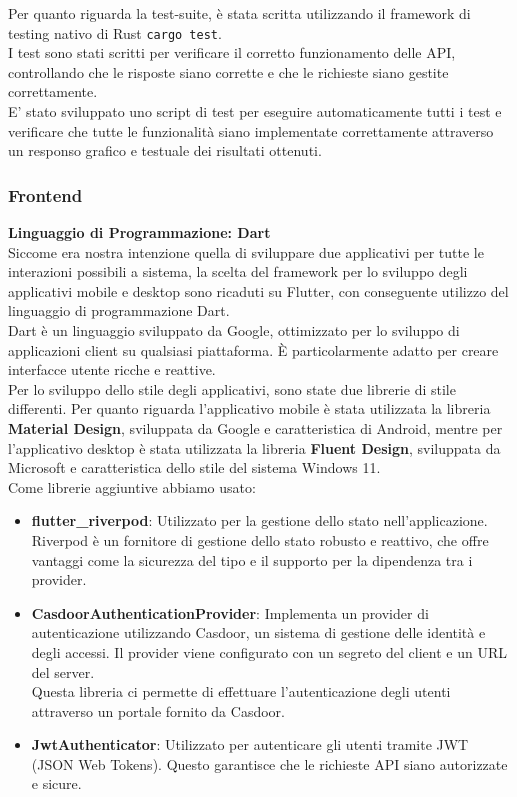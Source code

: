 \documentclass{article}
\begin{document}
Per quanto riguarda la test-suite, è stata scritta utilizzando il framework di testing nativo di Rust \texttt{cargo test}.\\
I test sono stati scritti per verificare il corretto funzionamento delle API, controllando che le risposte siano corrette e che le richieste siano gestite correttamente.\\
E' stato sviluppato uno script di test per eseguire automaticamente tutti i test e verificare che tutte le funzionalità siano implementate correttamente attraverso un responso grafico e testuale dei risultati ottenuti.

\subsubsection{Frontend}
\textbf{Linguaggio di Programmazione: Dart}\\
Siccome era nostra intenzione quella di sviluppare due applicativi per tutte le interazioni possibili a sistema, la scelta del framework per lo sviluppo degli applicativi mobile e desktop sono ricaduti su Flutter, con conseguente utilizzo del linguaggio di programmazione Dart.\\
 Dart è un linguaggio sviluppato da Google, ottimizzato per lo sviluppo di applicazioni client su qualsiasi piattaforma. È particolarmente adatto per creare interfacce utente ricche e reattive.\\
Per lo sviluppo dello stile degli applicativi, sono state due librerie di stile differenti. Per quanto riguarda l'applicativo mobile è stata utilizzata la libreria \textbf{Material Design}, sviluppata da Google e caratteristica di Android, mentre per l'applicativo desktop è stata utilizzata la libreria \textbf{Fluent Design}, sviluppata da Microsoft e caratteristica dello stile del sistema Windows 11.\\
Come librerie aggiuntive abbiamo usato:
\begin{itemize}
    \item \textbf{flutter\_riverpod}: Utilizzato per la gestione dello stato nell'applicazione. Riverpod è un fornitore di gestione dello stato robusto e reattivo, che offre vantaggi come la sicurezza del tipo e il supporto per la dipendenza tra i provider.
    \item \textbf{CasdoorAuthenticationProvider}: Implementa un provider di autenticazione utilizzando Casdoor, un sistema di gestione delle identità e degli accessi. Il provider viene configurato con un segreto del client e un URL del server. \\
    Questa libreria ci permette di effettuare l'autenticazione degli utenti attraverso un portale fornito da Casdoor. 
    \item \textbf{JwtAuthenticator}: Utilizzato per autenticare gli utenti tramite JWT (JSON Web Tokens). Questo garantisce che le richieste API siano autorizzate e sicure.
\end{itemize}
\end{document}
